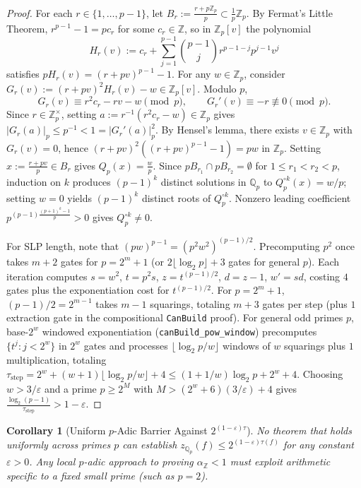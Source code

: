 \documentclass[11pt]{article}
\newtheorem{corollary}[theorem]{Corollary}
\newcommand{\Z}{\mathbb{Z}}
\newcommand{\Q}{\mathbb{Q}}
\newcommand{\code}[1]{\texttt{#1}}
\begin{document}
\begin{proof}
For each $r \in \{1, \dots, p-1\}$, let $B_r := \frac{r + p\Z_p}{p} \subset \frac{1}{p}\Z_p$. By Fermat's Little Theorem, $r^{p-1} - 1 = p c_r$ for some $c_r \in \Z$, so in $\Z_p[v]$ the polynomial
\[
  H_r(v) := c_r + \sum_{j=1}^{p-1} \binom{p-1}{j} r^{p-1-j} p^{j-1} v^j
\]
satisfies $p H_r(v) = (r + pv)^{p-1} - 1$. For any $w \in \Z_p$, consider $G_r(v) := (r + pv)^2 H_r(v) - w \in \Z_p[v]$. Modulo $p$,
\[
  G_r(v) \equiv r^2 c_r - r v - w \pmod p, \qquad G_r'(v) \equiv -r \not\equiv 0 \pmod p.
\]
Since $r \in \Z_p^\times$, setting $a := r^{-1}(r^2 c_r - w) \in \Z_p$ gives $|G_r(a)|_p \le p^{-1} < 1 = |G_r'(a)|_p^2$. By Hensel's lemma, there exists $v \in \Z_p$ with $G_r(v) = 0$, hence $(r+pv)^2((r+pv)^{p-1} - 1) = p w$ in $\Z_p$. Setting $x := \frac{r + pv}{p} \in B_r$ gives $Q_p(x) = \frac{w}{p}$. Since $p B_{r_1} \cap p B_{r_2} = \emptyset$ for $1 \le r_1 < r_2 < p$, induction on $k$ produces $(p - 1)^k$ distinct solutions in $\Q_p$ to $Q_p^{\circ k}(x) = w / p$; setting $w = 0$ yields $(p - 1)^k$ distinct roots of $Q_p^{\circ k}$. Nonzero leading coefficient $p^{(p-1)\frac{(p+1)^k-1}{p}} > 0$ gives $Q_p^{\circ k} \neq 0$.

For SLP length, note that $(pw)^{p-1} = (p^2 w^2)^{(p-1)/2}$. Precomputing $p^2$ once takes $m + 2$ gates for $p = 2^m + 1$ (or $2\lfloor \log_2 p \rfloor + 3$ gates for general $p$). Each iteration computes $s = w^2$, $t = p^2 s$, $z = t^{(p-1)/2}$, $d = z - 1$, $w' = s d$, costing $4$ gates plus the exponentiation cost for $t^{(p-1)/2}$. For $p = 2^m + 1$, $(p-1)/2 = 2^{m-1}$ takes $m - 1$ squarings, totaling $m + 3$ gates per step (plus $1$ extraction gate in the compositional \code{CanBuild} proof). For general odd primes $p$, base-$2^w$ windowed exponentiation (\code{canBuild\_pow\_window}) precomputes $\{t^j : j < 2^w\}$ in $2^w$ gates and processes $\lfloor \log_2 p / w \rfloor$ windows of $w$ squarings plus $1$ multiplication, totaling $\tau_{\mathrm{step}} = 2^w + (w+1)\lfloor \log_2 p / w \rfloor + 4 \le (1 + 1/w)\log_2 p + 2^w + 4$. Choosing $w > 3/\varepsilon$ and a prime $p \ge 2^M$ with $M > (2^w + 6)(3/\varepsilon) + 4$ gives $\frac{\log_2(p-1)}{\tau_{\mathrm{step}}} > 1 - \varepsilon$.
\end{proof}

\begin{corollary}[Uniform $p$-Adic Barrier Against $2^{(1-\varepsilon)\tau}$]
No theorem that holds uniformly across primes $p$ can establish $z_{\Q_p}(f) \le 2^{(1-\varepsilon)\tau(f)}$ for any constant $\varepsilon > 0$. Any local $p$-adic approach to proving $\alpha_{\Z} < 1$ must exploit arithmetic specific to a fixed small prime (such as $p = 2$).
\end{corollary}
\end{document}
